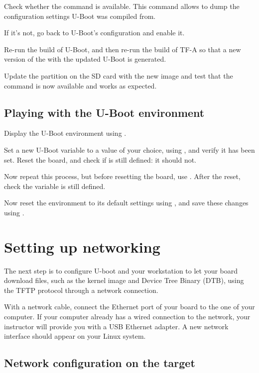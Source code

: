 Check whether the  command is available. This command
allows to dump the configuration settings U-Boot was compiled from.

If it's not, go back to U-Boot's configuration and enable it.

Re-run the build of U-Boot, and then re-run the build of TF-A so that
a new version of the  with the updated U-Boot is
generated.

Update the  partition on the SD card with the new
 image and test that the command is now available and
works as expected.

\subsection{Playing with the U-Boot environment}

Display the U-Boot environment using .

Set a new U-Boot variable  to a value of your choice, using
, and verify it has been set. Reset the board, and check
if  is still defined: it should not.

Now repeat this process, but before resetting the board, use
. After the reset, check the  variable is
still defined.

Now reset the environment to its default settings using , and save these changes using .

\section{Setting up networking}

The next step is to configure U-boot and your workstation to let your
board download files, such as the kernel image and Device Tree Binary
(DTB), using the TFTP protocol through a network connection.

With a network cable, connect the Ethernet port of
your board to the one of your computer. If your computer already has a
wired connection to the network, your instructor will provide you with
a USB Ethernet adapter. A new network interface should appear on your
Linux system.

\subsection{Network configuration on the target}

